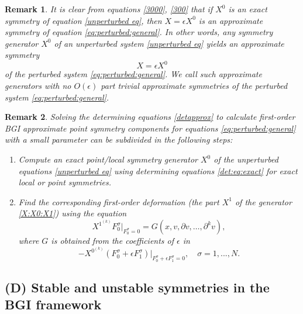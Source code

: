 \documentclass[11pt,letter,subeqn]{article}
\def\beq{\begin{equation}}
\def\eeq{\end{equation}}
\newtheorem{remark}{Remark}[section]
\begin{document}
\begin{remark}\label{rem:triv:BGI}
It is clear from equations \eqref{3000}, \eqref{300} that if $X^0$ is an exact symmetry of equation \eqref{unperturbed eq}, then $X=\epsilon X^0$ is an approximate symmetry of equation \eqref{eq:perturbed:general}. In other words, any symmetry generator $X^0$ of an unperturbed system \eqref{unperturbed eq} yields an approximate symmetry
\beq\label{eq:BGIsymm:trivial}
X=\epsilon X^0
\eeq
of the perturbed system \eqref{eq:perturbed:general}. We call such approximate generators with no $O(\epsilon)$ part \emph{trivial approximate symmetries} of the perturbed system \eqref{eq:perturbed:general}.
\end{remark}


\begin{remark} %
Solving the determining equations \eqref{detapprox} to calculate first-order BGI approximate point symmetry components for equations \eqref{eq:perturbed:general} with a small parameter can be subdivided in the following steps:
\begin{enumerate}
\item Compute an exact point/local symmetry generator $X^0$ of the unperturbed equations \eqref{unperturbed eq} using determining equations \eqref{det:eq:exact} for exact local or point symmetries.
\item Find the corresponding first-order deformation (the part $X^1$ of the generator \eqref{X:X0:X1}) using the equation
\[\label{11}
     X^{1^{(k)}}F_0^\sigma\bigg|_{F_0^\sigma=0}=G(x,v,\partial v,\ldots, \partial^k v),
\]
where $G$ is obtained from the coefficients of $\epsilon$ in
\[
  -X^{0^{(k)}}(F_0^\sigma+\epsilon F_1^\sigma)\bigg|_{F_0^\sigma+\epsilon F_1^\sigma=0}, \quad \sigma=1,...,N.
\]
\end{enumerate}
\end{remark}





\subsection*{\textbf{(D)} Stable and unstable symmetries in the BGI framework}
\end{document}
